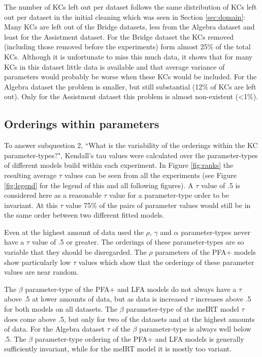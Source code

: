 \documentclass{scrartcl}
\begin{document}
The number of KCs left out per dataset follows the same distribution of KCs left out per dataset in the initial cleaning which was seen in Section \ref{sec:domain}: Many KCs are left out of the Bridge datasets, less from the Algebra dataset and least for the Assistment dataset. For the Bridge dataset the KCs removed (including those removed before the experiments) form almost 25\% of the total KCs. Although it is unfortunate to miss this much data, it shows that for many KCs in this dataset little data is available and that average variance of parameters would probably be worse when these KCs would be included. For the Algebra dataset the problem is smaller, but still substantial (12\% of KCs are left out). Only for the Assistment dataset this problem is almost non-existent (<1\%).

\subsection{Orderings within parameters}
\label{sec:rankresults}


To answer subquestion 2, ``What is the variability of the orderings within the KC parameter-types?", Kendall's tau values were calculated over the parameter-types of different models build within each experiment. In Figure \ref{fig:ranks} the resulting average $\tau$ values can be seen from all the experiments (see Figure \ref{fig:legend} for the legend of this and all following figures). A $\tau$ value of .5 is considered here as a reasonable $\tau$ value for a parameter-type order to be invariant. At this $\tau$ value 75\% of the pairs of parameter values would still be in the same order between two different fitted models.



Even at the highest amount of data used the $\rho$, $\gamma$ and $\alpha$ parameter-types never have a $\tau$ value of .5 or greater. The orderings of these parameter-types are so variable that they should be disregarded. The $\rho$ parameters of the PFA+ models show particularly low $\tau$ values which show that the orderings of these parameter values are near random.



The $\beta$ parameter-type of the PFA+ and LFA models do not always have a $\tau$ above .5 at lower amounts of data, but as data is increased $\tau$ increases above .5 for both models on all datasets. The $\beta$ parameter-type of the meIRT model $\tau$ does come above .5, but only for two of the datasets and at the highest amounts of data. For the Algebra dataset $\tau$ of the $\beta$ parameter-type is always well below .5. The $\beta$ parameter-type ordering of the PFA+ and LFA models is generally sufficiently invariant, while for the meIRT model it is mostly too variant.
\end{document}
